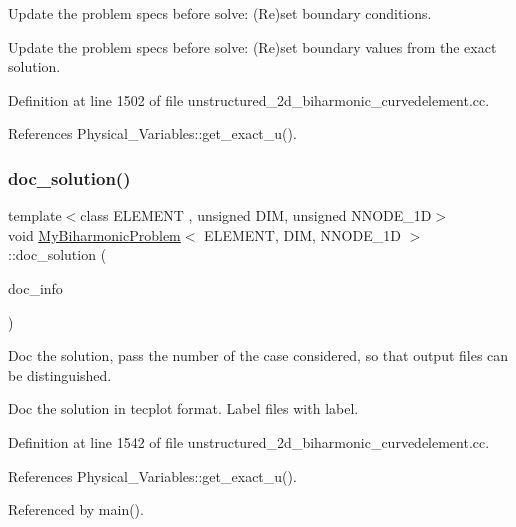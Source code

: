Update the problem specs before solve\+: (Re)set boundary conditions. 

Update the problem specs before solve\+: (Re)set boundary values from the exact solution. 

Definition at line 1502 of file unstructured\+\_\+2d\+\_\+biharmonic\+\_\+curvedelement.\+cc.



References Physical\+\_\+\+Variables\+::get\+\_\+exact\+\_\+u().

\mbox{\label{classMyBiharmonicProblem_aa1c9d6b8298b2b78f5df9343349ecd70}} 
\subsubsection{\texorpdfstring{doc\+\_\+solution()}{doc\_solution()}}
{\footnotesize\ttfamily template$<$class E\+L\+E\+M\+E\+NT , unsigned D\+IM, unsigned N\+N\+O\+D\+E\+\_\+1D$>$ \\
void \hyperlink{classMyBiharmonicProblem}{My\+Biharmonic\+Problem}$<$ E\+L\+E\+M\+E\+NT, D\+IM, N\+N\+O\+D\+E\+\_\+1D $>$\+::doc\+\_\+solution (\begin{DoxyParamCaption}\item[{Doc\+Info \&}]{doc\+\_\+info }\end{DoxyParamCaption})}



Doc the solution, pass the number of the case considered, so that output files can be distinguished. 

Doc the solution in tecplot format. Label files with label. 

Definition at line 1542 of file unstructured\+\_\+2d\+\_\+biharmonic\+\_\+curvedelement.\+cc.



References Physical\+\_\+\+Variables\+::get\+\_\+exact\+\_\+u().



Referenced by main().

\mbox{\label{classMyBiharmonicProblem_a40167119fb35b4926185b7adc23a6358}} 
